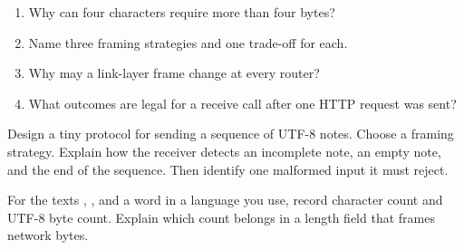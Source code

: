 \reviewtitle
\begin{enumerate}
  \item Why can four characters require more than four bytes?
  \item Name three framing strategies and one trade-off for each.
  \item Why may a link-layer frame change at every router?
  \item What outcomes are legal for a receive call after one HTTP request was sent?
\end{enumerate}

\begin{exercise}
Design a tiny protocol for sending a sequence of UTF-8 notes. Choose a framing
strategy. Explain how the receiver detects an incomplete note, an empty note,
and the end of the sequence. Then identify one malformed input it must reject.
\end{exercise}

\begin{exercise}
For the texts , , and a word in a language you use,
record character count and UTF-8 byte count. Explain which count belongs in a
length field that frames network bytes.
\end{exercise}
